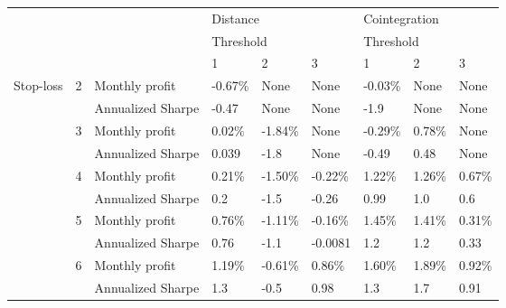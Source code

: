 \begin{tabular}{lllllllll}
\toprule
          &   &                   & \multicolumn{3}{l}{Distance} & \multicolumn{3}{l}{Cointegration} \\
          &   &                   & \multicolumn{3}{l}{Threshold} & \multicolumn{3}{l}{Threshold} \\
          &   &                   &         1 &        2 &        3 &             1 &       2 &       3 \\
\midrule
Stop-loss & 2 & Monthly profit &   -0.67\% &     None &     None &       -0.03\% &    None &    None \\
          &   & Annualized Sharpe &     -0.47 &     None &     None &          -1.9 &    None &    None \\
          & 3 & Monthly profit &    0.02\% &  -1.84\% &     None &       -0.29\% &  0.78\% &    None \\
          &   & Annualized Sharpe &     0.039 &     -1.8 &     None &         -0.49 &    0.48 &    None \\
          & 4 & Monthly profit &    0.21\% &  -1.50\% &  -0.22\% &        1.22\% &  1.26\% &  0.67\% \\
          &   & Annualized Sharpe &       0.2 &     -1.5 &    -0.26 &          0.99 &     1.0 &     0.6 \\
          & 5 & Monthly profit &    0.76\% &  -1.11\% &  -0.16\% &        1.45\% &  1.41\% &  0.31\% \\
          &   & Annualized Sharpe &      0.76 &     -1.1 &  -0.0081 &           1.2 &     1.2 &    0.33 \\
          & 6 & Monthly profit &    1.19\% &  -0.61\% &   0.86\% &        1.60\% &  1.89\% &  0.92\% \\
          &   & Annualized Sharpe &       1.3 &     -0.5 &     0.98 &           1.3 &     1.7 &    0.91 \\
\bottomrule
\end{tabular}
